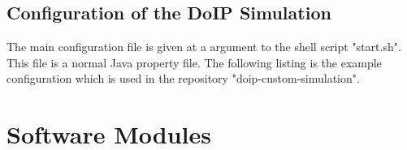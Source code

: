\documentclass[a4paper]{article}
\begin{document}
	\subsection{Configuration of the DoIP Simulation}
		
		The main configuration file is given at a argument to the shell script
		"start.sh". This file is a normal Java property file. The following 
		listing is the example configuration which is used in the repository
		"doip-custom-simulation".



\section{Software Modules}
\end{document}
